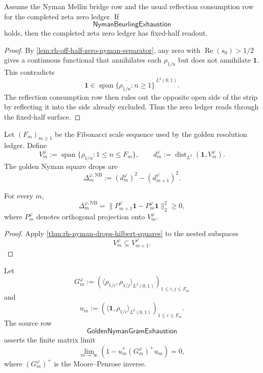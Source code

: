 \begin{theorem}
\label{thm:rh-nyman-exhaustion-fixed-half-readout}
Assume the Nyman Mellin bridge row and the usual reflection consumption
row for the completed zeta zero ledger.  If
$$
\mathsf{NymanBeurlingExhaustion}
$$
holds, then the completed zeta zero ledger has fixed-half readout.
\end{theorem}

\begin{proof}
By \autoref{lem:rh-off-half-zero-nyman-separator}, any zero with
$\operatorname{Re}(s_0)>1/2$ gives a continuous functional that
annihilates each $\rho_{1/n}$ but does not annihilate $\mathbf 1$.
This contradicts
$$
\mathbf 1\in
\overline{
\operatorname{span}\{\rho_{1/n}:n\ge1\}
}^{\,L^2(0,1)}.
$$
The reflection consumption row then rules out the opposite open side of
the strip by reflecting it into the side already excluded.  Thus the
zero ledger reads through the fixed-half surface.
\end{proof}

\begin{definition}
\label{def:rh-golden-nyman-square-tower}
Let $(F_m)_{m\ge1}$ be the Fibonacci scale sequence used by the golden
resolution ledger.  Define
$$
V_m^{\varphi}
:=
\operatorname{span}\{\rho_{1/n}:1\le n\le F_m\},
\qquad
d_m^{\varphi}:=
\operatorname{dist}_{L^2}(\mathbf 1,V_m^{\varphi}).
$$
The golden Nyman square drops are
$$
\Delta_m^{\varphi,\mathrm{NB}}
:=
(d_m^{\varphi})^2-(d_{m+1}^{\varphi})^2.
$$
\end{definition}

\begin{corollary}
\label{cor:rh-golden-nyman-drops-squares}
For every $m$,
$$
\Delta_m^{\varphi,\mathrm{NB}}
=
\|P_{m+1}^{\varphi}\mathbf 1-P_m^{\varphi}\mathbf 1\|_2^2
\ge0,
$$
where $P_m^{\varphi}$ denotes orthogonal projection onto
$V_m^{\varphi}$.
\end{corollary}

\begin{proof}
Apply \autoref{thm:rh-nyman-drops-hilbert-squares} to the nested
subspaces
$$
V_m^{\varphi}\subseteq V_{m+1}^{\varphi}.
$$
\end{proof}

\begin{definition}
\label{def:rh-golden-nyman-gram-exhaustion}
Let
$$
G_m^{\varphi}
:=
\left(
\langle \rho_{1/i},\rho_{1/j}\rangle_{L^2(0,1)}
\right)_{1\le i,j\le F_m}
$$
and
$$
u_m
:=
\left(
\langle \mathbf 1,\rho_{1/i}\rangle_{L^2(0,1)}
\right)_{1\le i\le F_m}.
$$
The source row
$$
\mathsf{GoldenNymanGramExhaustion}
$$
asserts the finite matrix limit
$$
\lim_{m\to\infty}
\left(
1-u_m^\ast (G_m^{\varphi})^+u_m
\right)
=0,
$$
where $(G_m^{\varphi})^+$ is the Moore--Penrose inverse.
\end{definition}

